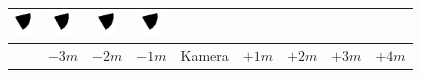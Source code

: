 \begin{tabular}{|c|c|c|c|c|c|c|c|c|}
	\includegraphics[width=0.5cm]{img_Bereich/V2_vid_res_Winkel_Y_1000_9000.png}&
	\includegraphics[width=0.5cm]{img_Bereich/V2_vid_res_Winkel_Y_2000_9000.png}&
	\includegraphics[width=0.5cm]{img_Bereich/V2_vid_res_Winkel_Y_3000_9000.png}&
	\includegraphics[width=0.5cm]{img_Bereich/V2_vid_res_Winkel_Y_4000_9000.png}\\ 
	\hline 
	& $-3m$ & $-2m$ & $-1m$ &Kamera& $+1m$ & $+2m$ & $+3m$ & $+4m$ \\ 
	\hline 
\end{tabular}{\tiny }